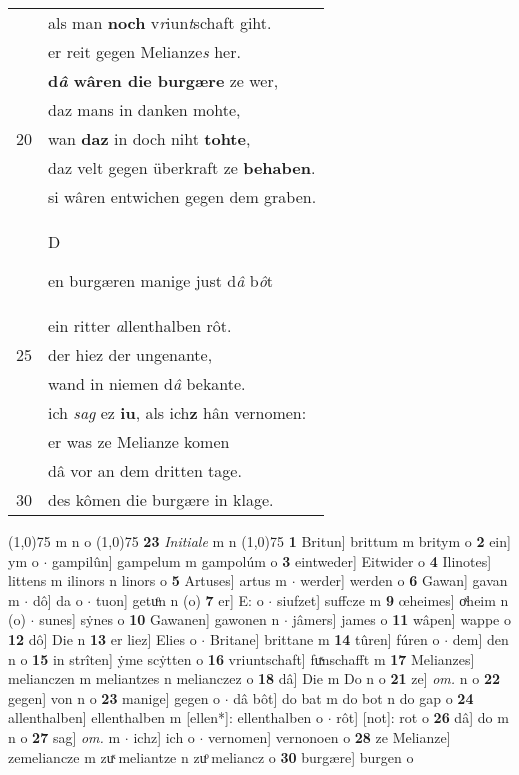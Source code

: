 \documentclass[8pt,a4paper,notitlepage]{article}
\begin{document}
\begin{table}[ht]
\begin{minipage}[t]{0.5\linewidth}
\begin{tabular}{rl}
 & als man \textbf{noch} v\textit{r}iun\textit{t}schaft giht.\\ 
 & er reit gegen Melianze\textit{s} her.\\ 
 & \textbf{d\textit{â} wâren die burgære} ze wer,\\ 
 & daz mans in danken mohte,\\ 
20 & wan \textbf{daz} in doch niht \textbf{tohte},\\ 
 & daz velt gegen überkraft ze \textbf{behaben}.\\ 
 & si wâren entwichen gegen dem graben.\\ 
 & \begin{large}D\end{large}en burgæren manige just d\textit{â} b\textit{ô}t\\ 
 & ein ritter \textit{a}llenthalben rôt.\\ 
25 & der hiez der ungenante,\\ 
 & wand in niemen d\textit{â} bekante.\\ 
 & ich \textit{sag} ez \textbf{iu}, als ich\textbf{z} hân vernomen:\\ 
 & er was ze Melianze komen\\ 
 & dâ vor an dem dritten tage.\\ 
30 & des kômen die burgære in klage.\\ 
\end{tabular}
\scriptsize
\line(1,0){75} \newline
m n o \newline
\line(1,0){75} \newline
\textbf{23} \textit{Initiale} m n  \newline
\line(1,0){75} \newline
\textbf{1} Britun] brittum m britym o \textbf{2} ein] ym o  $\cdot$ gampilûn] gampelum m gampolúm o \textbf{3} eintweder] Eitwider o \textbf{4} Ilinotes] littens m ilinors n linors o \textbf{5} Artuses] artus m  $\cdot$ werder] werden o \textbf{6} Gawan] gavan m  $\cdot$ dô] da o  $\cdot$ tuon] getuͦn n (o) \textbf{7} er] E: o  $\cdot$ siufzet] suffcze m \textbf{9} œheimes] oͯheim n (o)  $\cdot$ sunes] sẏnes o \textbf{10} Gawanen] gawonen n  $\cdot$ jâmers] james o \textbf{11} wâpen] wappe o \textbf{12} dô] Die n \textbf{13} er liez] Elies o  $\cdot$ Britane] brittane m \textbf{14} tûren] fúren o  $\cdot$ dem] den n o \textbf{15} in strîten] ẏme scẏtten o \textbf{16} vriuntschaft] fuͯnschafft m \textbf{17} Melianzes] melianczen m meliantzes n melianczez o \textbf{18} dâ] Die m Do n o \textbf{21} ze] \textit{om.} n o \textbf{22} gegen] von n o \textbf{23} manige] gegen o  $\cdot$ dâ bôt] do bat m do bot n do gap o \textbf{24} allenthalben] ellenthalben m [ellen*]: ellenthalben o  $\cdot$ rôt] [not]: rot o \textbf{26} dâ] do m n o \textbf{27} sag] \textit{om.} m  $\cdot$ ichz] ich o  $\cdot$ vernomen] vernonoen o \textbf{28} ze Melianze] zemeliancze m zuͯ meliantze n zuͦ meliancz o \textbf{30} burgære] burgen o \newline
\end{minipage}
\end{table}
\end{document}
